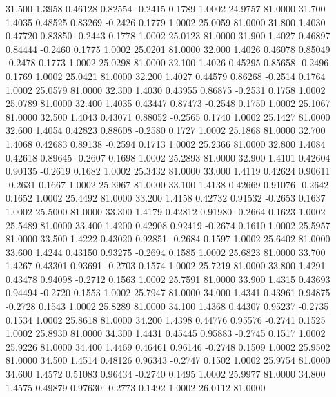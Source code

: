   31.500   1.3958   0.46128   0.82554  -0.2415   0.1789   1.0002  24.9757  81.0000
  31.700   1.4035   0.48525   0.83269  -0.2426   0.1779   1.0002  25.0059  81.0000
  31.800   1.4030   0.47720   0.83850  -0.2443   0.1778   1.0002  25.0123  81.0000
  31.900   1.4027   0.46897   0.84444  -0.2460   0.1775   1.0002  25.0201  81.0000
  32.000   1.4026   0.46078   0.85049  -0.2478   0.1773   1.0002  25.0298  81.0000
  32.100   1.4026   0.45295   0.85658  -0.2496   0.1769   1.0002  25.0421  81.0000
  32.200   1.4027   0.44579   0.86268  -0.2514   0.1764   1.0002  25.0579  81.0000
  32.300   1.4030   0.43955   0.86875  -0.2531   0.1758   1.0002  25.0789  81.0000
  32.400   1.4035   0.43447   0.87473  -0.2548   0.1750   1.0002  25.1067  81.0000
  32.500   1.4043   0.43071   0.88052  -0.2565   0.1740   1.0002  25.1427  81.0000
  32.600   1.4054   0.42823   0.88608  -0.2580   0.1727   1.0002  25.1868  81.0000
  32.700   1.4068   0.42683   0.89138  -0.2594   0.1713   1.0002  25.2366  81.0000
  32.800   1.4084   0.42618   0.89645  -0.2607   0.1698   1.0002  25.2893  81.0000
  32.900   1.4101   0.42604   0.90135  -0.2619   0.1682   1.0002  25.3432  81.0000
  33.000   1.4119   0.42624   0.90611  -0.2631   0.1667   1.0002  25.3967  81.0000
  33.100   1.4138   0.42669   0.91076  -0.2642   0.1652   1.0002  25.4492  81.0000
  33.200   1.4158   0.42732   0.91532  -0.2653   0.1637   1.0002  25.5000  81.0000
  33.300   1.4179   0.42812   0.91980  -0.2664   0.1623   1.0002  25.5489  81.0000
  33.400   1.4200   0.42908   0.92419  -0.2674   0.1610   1.0002  25.5957  81.0000
  33.500   1.4222   0.43020   0.92851  -0.2684   0.1597   1.0002  25.6402  81.0000
  33.600   1.4244   0.43150   0.93275  -0.2694   0.1585   1.0002  25.6823  81.0000
  33.700   1.4267   0.43301   0.93691  -0.2703   0.1574   1.0002  25.7219  81.0000
  33.800   1.4291   0.43478   0.94098  -0.2712   0.1563   1.0002  25.7591  81.0000
  33.900   1.4315   0.43693   0.94494  -0.2720   0.1553   1.0002  25.7947  81.0000
  34.000   1.4341   0.43961   0.94875  -0.2728   0.1543   1.0002  25.8289  81.0000
  34.100   1.4368   0.44307   0.95237  -0.2735   0.1534   1.0002  25.8618  81.0000
  34.200   1.4398   0.44776   0.95576  -0.2741   0.1525   1.0002  25.8930  81.0000
  34.300   1.4431   0.45445   0.95883  -0.2745   0.1517   1.0002  25.9226  81.0000
  34.400   1.4469   0.46461   0.96146  -0.2748   0.1509   1.0002  25.9502  81.0000
  34.500   1.4514   0.48126   0.96343  -0.2747   0.1502   1.0002  25.9754  81.0000
  34.600   1.4572   0.51083   0.96434  -0.2740   0.1495   1.0002  25.9977  81.0000
  34.800   1.4575   0.49879   0.97630  -0.2773   0.1492   1.0002  26.0112  81.0000
